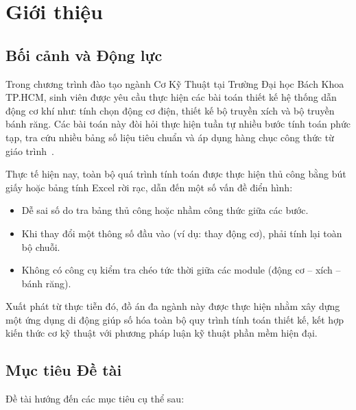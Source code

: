 \chapter{Giới thiệu}
\label{chap:introduction}

\section{Bối cảnh và Động lực}
\label{sec:intro-motivation}

Trong chương trình đào tạo ngành Cơ Kỹ Thuật tại Trường Đại học Bách Khoa TP.HCM,
sinh viên được yêu cầu thực hiện các bài toán thiết kế hệ thống dẫn động cơ khí như:
tính chọn động cơ điện, thiết kế bộ truyền xích và bộ truyền bánh răng.
Các bài toán này đòi hỏi thực hiện tuần tự nhiều bước tính toán phức tạp,
tra cứu nhiều bảng số liệu tiêu chuẩn và áp dụng hàng chục công thức từ giáo trình~\cite{trinh2006tinh,Loc2023GiaoTrinh,Loc2020ThietKe}.

Thực tế hiện nay, toàn bộ quá trình tính toán được thực hiện thủ công bằng bút giấy
hoặc bảng tính Excel rời rạc, dẫn đến một số vấn đề điển hình:
\begin{itemize}
  \item Dễ sai số do tra bảng thủ công hoặc nhầm công thức giữa các bước.
  \item Khi thay đổi một thông số đầu vào (ví dụ: thay động cơ), phải tính lại toàn bộ chuỗi.
  \item Không có công cụ kiểm tra chéo tức thời giữa các module (động cơ -- xích -- bánh răng).
\end{itemize}

Xuất phát từ thực tiễn đó, đồ án đa ngành này được thực hiện nhằm xây dựng một
ứng dụng di động giúp số hóa toàn bộ quy trình tính toán thiết kế,
kết hợp kiến thức cơ kỹ thuật với phương pháp luận kỹ thuật phần mềm hiện đại.

\section{Mục tiêu Đề tài}
\label{sec:intro-objectives}

Đề tài hướng đến các mục tiêu cụ thể sau:

